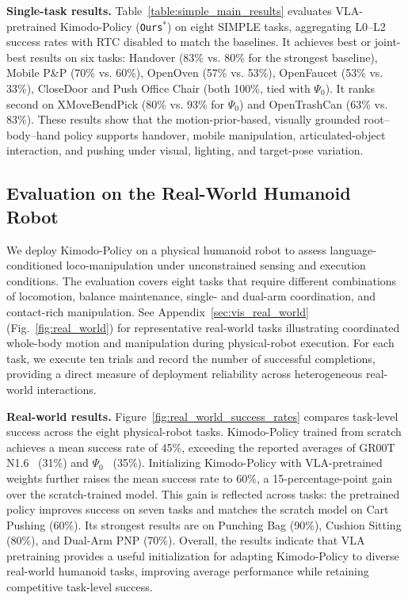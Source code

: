 \textbf{Single-task results.} Table~\ref{table:simple_main_results} evaluates VLA-pretrained Kimodo-Policy (\texttt{Ours}$^{*}$) on eight SIMPLE tasks, aggregating L0--L2 success rates with RTC disabled to match the baselines. It achieves best or joint-best results on six tasks: Handover (83\% vs. 80\% for the strongest baseline), Mobile P\&P (70\% vs. 60\%), OpenOven (57\% vs. 53\%), OpenFaucet (53\% vs. 33\%), CloseDoor and Push Office Chair (both 100\%, tied with $\Psi_0$). It ranks second on XMoveBendPick (80\% vs. 93\% for $\Psi_0$) and OpenTrashCan (63\% vs. 83\%). These results show that the motion-prior-based, visually grounded root--body--hand policy supports handover, mobile manipulation, articulated-object interaction, and pushing under visual, lighting, and target-pose variation.



\subsection{Evaluation on the Real-World Humanoid Robot}
\label{sec:exp_real}
We deploy Kimodo-Policy on a physical humanoid robot to assess language-conditioned loco-manipulation under unconstrained sensing and execution conditions. The evaluation covers eight tasks that require different combinations of locomotion, balance maintenance, single- and dual-arm coordination, and contact-rich manipulation. See Appendix~\ref{sec:vis_real_world} (Fig.~\ref{fig:real_world}) for representative real-world tasks illustrating coordinated whole-body motion and manipulation during physical-robot execution. For each task, we execute ten trials and record the number of successful completions, providing a direct measure of deployment reliability across heterogeneous real-world interactions.



\textbf{Real-world results.} Figure~\ref{fig:real_world_success_rates} compares task-level success across the eight physical-robot tasks. Kimodo-Policy trained from scratch achieves a mean success rate of 45\%, exceeding the reported averages of GR00T N1.6~\cite{grootn1} (31\%) and $\Psi_0$~\cite{psi0} (35\%). Initializing Kimodo-Policy with VLA-pretrained weights further raises the mean success rate to 60\%, a 15-percentage-point gain over the scratch-trained model. This gain is reflected across tasks: the pretrained policy improves success on seven tasks and matches the scratch model on Cart Pushing (60\%). Its strongest results are on Punching Bag (90\%), Cushion Sitting (80\%), and Dual-Arm PNP (70\%). Overall, the results indicate that VLA pretraining provides a useful initialization for adapting Kimodo-Policy to diverse real-world humanoid tasks, improving average performance while retaining competitive task-level success.

